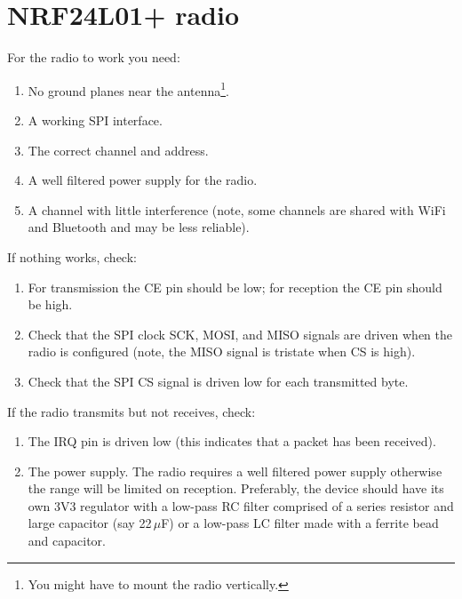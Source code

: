 


\section{NRF24L01+ radio}
\label{nrf24l01-radio}

For the radio to work you need:

\begin{enumerate}
\item No ground planes near the antenna\footnote{You might have to
  mount the radio vertically.}.
\item
  A working SPI interface.
\item
  The correct channel and address.
\item
  A well filtered power supply for the radio.
\item
  A channel with little interference (note, some channels are shared
  with WiFi and Bluetooth and may be less reliable).
\end{enumerate}

If nothing works, check:

\begin{enumerate}
\item
  For transmission the CE pin should be low; for reception the CE pin
  should be high.
\item
  Check that the SPI clock SCK, MOSI, and MISO signals are driven when
  the radio is configured (note, the MISO signal is tristate when CS is
  high).
\item
  Check that the SPI CS signal is driven low for each transmitted byte.
\end{enumerate}

If the radio transmits but not receives, check:

\begin{enumerate}
\item
  The IRQ pin is driven low (this indicates that a packet has been
  received).
\item
  The power supply. The radio requires a well filtered power supply
  otherwise the range will be limited on reception. Preferably, the
  device should have its own 3V3 regulator with a low-pass RC filter
  comprised of a series resistor and large capacitor (say 22\,$\mu$F) or a
  low-pass LC filter made with a ferrite bead and capacitor.
\end{enumerate}


